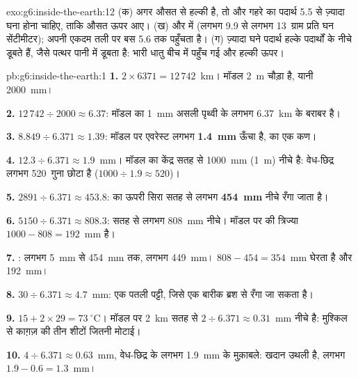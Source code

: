 \begin{solution}{exo:g6:inside-the-earth:12}
(क) अगर  औसत से हल्की है, तो और गहरे का पदार्थ 5.5 से ज़्यादा घना होना
चाहिए, ताकि औसत ऊपर आए। (ख)  और
 में (लगभग 9.9 से लगभग 13~ग्राम प्रति घन सेंटीमीटर); 
अपनी एकदम तली पर बस 5.6 तक पहुँचता है। (ग) ज़्यादा घने पदार्थ हल्के पदार्थों के नीचे
डूबते हैं, जैसे पत्थर पानी में डूबता है: भारी धातु बीच में
पहुँच गई और हल्की  ऊपर।
\end{solution}

\begin{solution}{pb:g6:inside-the-earth:1}
\textbf{1.} $2 \times 6371 = 12\,742$~km। मॉडल 2~m चौड़ा है, यानी
2000~mm।

\textbf{2.} $12\,742 \div 2000 \approx 6.37$: मॉडल का 1~mm असली पृथ्वी के लगभग
6.37~km के बराबर है।

\textbf{3.} $8.849 \div 6.371 \approx 1.39$: मॉडल पर एवरेस्ट लगभग
\textbf{1.4~mm} ऊँचा है,  का एक कण।

\textbf{4.} $12.3 \div 6.371 \approx 1.9$~mm। मॉडल का केंद्र सतह से
1000~mm (1~m) नीचे है: वेध-छिद्र लगभग 520~गुना छोटा है
($1000 \div 1.9 \approx 520$)।

\textbf{5.} $2891 \div 6.371 \approx 453.8$:  का ऊपरी सिरा सतह से
लगभग \textbf{454~mm} नीचे रँगा जाता है।

\textbf{6.} $5150 \div 6.371 \approx 808.3$: सतह से लगभग 808~mm
नीचे। मॉडल पर  की त्रिज्या $1000 - 808 = 192$~mm है।

\textbf{7.} : लगभग 5~mm से 454~mm तक, लगभग 449~mm।  $808 - 454 = 354$~mm घेरता है और  192~mm।

\textbf{8.} $30 \div 6.371 \approx 4.7$~mm: एक पतली पट्टी, जिसे एक बारीक
ब्रश से रँगा जा सकता है।

\textbf{9.} $15 + 2 \times 29 = 73~^\circ$C। मॉडल पर 2~km सतह से
$2 \div 6.371 \approx 0.31$~mm नीचे है: मुश्किल से काग़ज़ की
तीन शीटों जितनी मोटाई।

\textbf{10.} $4 \div 6.371 \approx 0.63$~mm, वेध-छिद्र के लगभग 1.9~mm के
मुक़ाबले: खदान उथली है, लगभग $1.9 - 0.6 = 1.3$~mm।


\end{solution}

